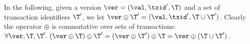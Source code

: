 
In the following, given a version $\ver = (\val, \txid', \T)$ and a set of 
transaction identifiers $\T'$, we let $\ver \oplus \T' = (\val, \txid', \T \cup \T')$. 
Clearly the operator $\oplus$ is commutative over sets of transactions: 
$\forall \ver, \T, \T'.\; (\ver \oplus \T) \oplus \T' = (\ver \oplus \T') \oplus \T = 
\ver \oplus (\T \cup \T')$.

